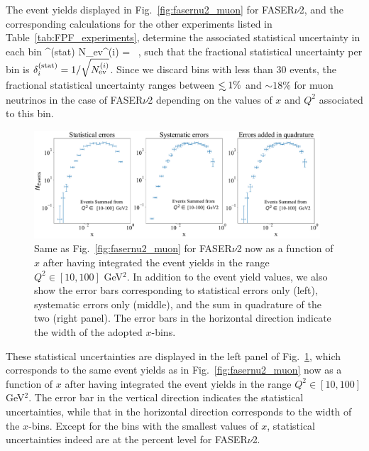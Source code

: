 The event yields displayed in Fig.~\ref{fig:fasernu2_muon} for FASER$\nu$2, and the corresponding
calculations for the other experiments listed in Table~\ref{tab:FPF_experiments},
determine the associated statistical uncertainty in each bin
\be
\label{eq:statistical_uncertainties}
\delta^{\rm (stat)}  N_{\rm ev}^{(i)} =  \, ,
\ee
such that the fractional statistical uncertainty per bin is $\delta^{\rm (stat)}_i=1/\sqrt{N_{\rm ev}^{(i)}}$.
%
Since we discard bins with less than 30 events, the fractional statistical uncertainty
ranges between $\lsim 1\%$ and $\sim 18\%$ for muon neutrinos in
the case of FASER$\nu$2 depending on the values of
$x$ and $Q^2$ associated to this bin.

\begin{figure}[h]
    \centering
    \includegraphics[width = 0.95\textwidth]{plots/error_plot_FASERv2_14.pdf}
    \caption{Same as Fig.~\ref{fig:fasernu2_muon} for FASER$\nu$2
      now as a function of $x$ after having integrated the event yields in the range $Q^2 \in [10,100]$ GeV$^2$.
      In addition to the event yield values, we also show the error bars corresponding to
      statistical errors only (left), systematic errors only (middle), and the
      sum in quadrature of the two (right panel).
      The error bars in the horizontal direction indicate the width of the adopted $x$-bins.
      }
    \label{fig:error_plot_FASERv2_14}
\end{figure}

These statistical uncertainties are displayed in the left panel
of Fig.~\ref{fig:error_plot_FASERv2_14}, which corresponds
to the same event yields as in
Fig.~\ref{fig:fasernu2_muon}
now as a function of $x$ after having integrated the event yields in the range $Q^2 \in [10,100]$ GeV$^2$.
%
The error bar in the vertical direction indicates the statistical uncertainties, while
that in the horizontal direction corresponds to the width of the $x$-bins.
%
Except for the bins with the smallest values of $x$, statistical uncertainties indeed
are at the percent level for FASER$\nu$2.

